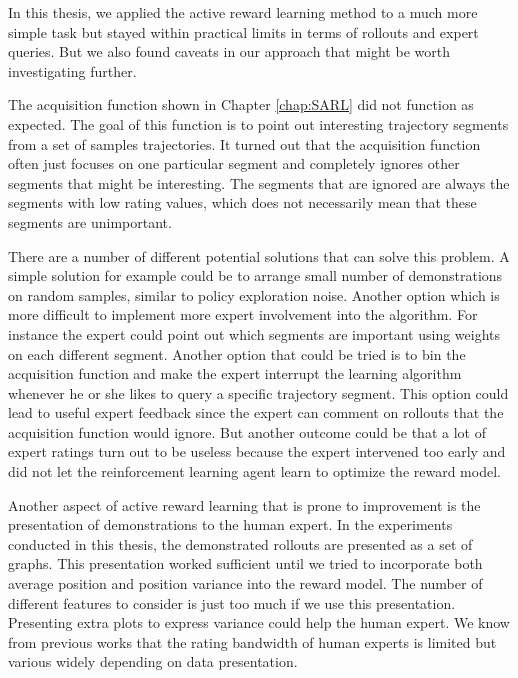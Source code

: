 \documentclass[mscThesis.tex]{subfiles}
\begin{document}
In this thesis, we applied the active reward learning method to a much more simple task but stayed within practical limits in terms of rollouts and expert queries. But we also found caveats in our approach that might be worth investigating further. 

The acquisition function shown in Chapter \ref{chap:SARL} did not function as expected. The goal of this function is to point out interesting trajectory segments from a set of samples trajectories. It turned out that the acquisition function often just focuses on one particular segment and completely ignores other segments that might be interesting. The segments that are ignored are always the segments with low rating values, which does not necessarily mean that these segments are unimportant. 

There are a number of different potential solutions that can solve this problem. A simple solution for example could be to arrange small number of demonstrations on random samples, similar to policy exploration noise. Another option which is more difficult to implement more expert involvement into the algorithm. For instance the expert could point out which segments are important using weights on each different segment. Another option that could be tried is to bin the acquisition function and make the expert interrupt the learning algorithm whenever he or she likes to query a specific trajectory segment. This option could lead to useful expert feedback since the expert can comment on rollouts that the acquisition function would ignore. But another outcome could be that a lot of expert ratings turn out to be useless because the expert intervened too early and did not let the reinforcement learning agent learn to optimize the reward model.

Another aspect of active reward learning that is prone to improvement is the presentation of demonstrations to the human expert. In the experiments conducted in this thesis, the demonstrated rollouts are presented as a set of graphs. This presentation worked sufficient until we tried to incorporate both average position and position variance into the reward model. The number of different features to consider is just too much if we use this presentation. Presenting extra plots to express variance could help the human expert. We know from previous works \cite{miller1956magical} that the rating bandwidth of human experts is limited but various widely depending on data presentation.



% 
\end{document}
